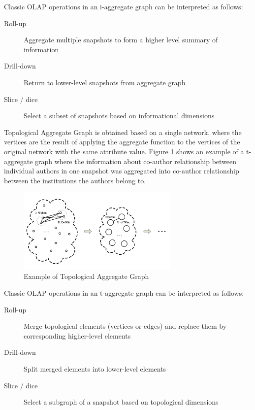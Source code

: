Classic OLAP operations in an i-aggregate graph can be interpreted as follows:
\begin{description}
\item[Roll-up] Aggregate multiple snapshots to form a higher level summary of information
\item[Drill-down] Return to lower-level snapshots from aggregate graph
\item[Slice / dice] Select a subset of snapshots based on informational dimensions
\end{description}
 
Topological Aggregate Graph is obtained based on a single network, where the vertices are the result of applying the aggregate function to the vertices of the original network with the same attribute value. Figure \ref{fig:figure16} shows an example of a t-aggregate graph where the information about co-author relationship between individual authors in one snapshot was aggregated into co-author relationship between the institutions the authors belong to.

\begin{figure}[ht]
\centering
\includegraphics[width=0.7\textwidth]{../t_aggregated_graph_example.png}
\caption{Example of Topological Aggregate Graph \cite{Chen2008}}
\label{fig:figure16}
\end{figure}

Classic OLAP operations in an t-aggregate graph can be interpreted as follows:
\begin{description}
\item[Roll-up] Merge topological elements (vertices or edges) and replace them by corresponding higher-level elements
\item[Drill-down] Split merged elements into lower-level elements
\item[Slice / dice] Select a subgraph of a snapshot based on topological dimensions
\end{description}

